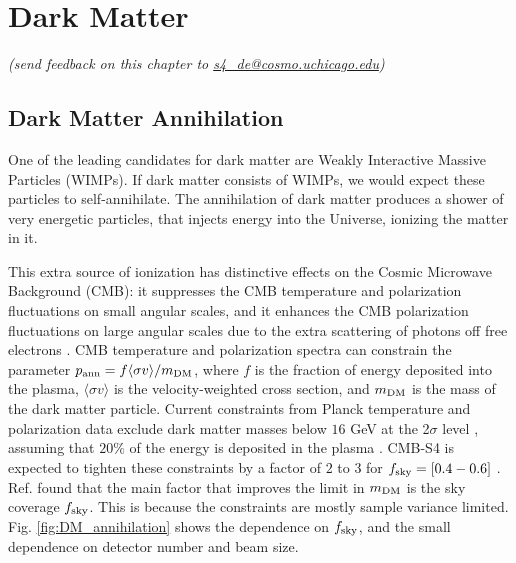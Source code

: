 \chapter{Dark Matter}
\begin{center}
{\small \it (send feedback on this chapter to \href{mailto:s4_de@cosmo.uchicago.edu}{s4\_de@cosmo.uchicago.edu})}
\end{center}

\begin{quotation}


\end{quotation}

\section{Dark Matter Annihilation}

One of the leading candidates for dark matter are Weakly Interactive Massive Particles (WIMPs). If dark matter consists of WIMPs, we would expect these particles to self-annihilate. The annihilation of dark matter produces a shower of very energetic particles, that injects energy into the Universe, ionizing the matter in it.

This extra source of ionization has distinctive effects on the Cosmic Microwave Background (CMB): it suppresses the CMB temperature and polarization fluctuations on small angular scales, and it enhances the CMB polarization fluctuations on large angular scales due to the extra scattering of photons off free electrons \cite{Chen:2003gz,Padmanabhan:2005es}.
CMB temperature and polarization spectra can constrain the parameter
$p_{\rm ann}=f\langle\sigma v\rangle/m_{\rm DM}$, where $f$ is the fraction of energy
deposited into the plasma, $\langle\sigma v\rangle$ is the velocity-weighted
cross section, and $m_{\rm DM}$ is the mass of the dark matter particle.
Current constraints from Planck temperature and polarization data exclude
dark matter masses below $16$ GeV at the 2$\sigma$ level \cite{Ade:2015xua}, assuming that
$20\%$ of the energy is deposited in the plasma \cite{Madhavacheril:2013cna}. CMB-S4 is expected to tighten these constraints by a factor of $2$ to $3$ for $f_{\rm sky}=[0.4-0.6]$ \cite{Wu:2014hta}. 
Ref. \cite{Wu:2014hta} found that the main factor that improves the limit in $m_{\rm DM}$ is the sky coverage $f_{\rm sky}$. This is because the constraints are mostly sample variance limited. Fig. \ref{fig:DM_annihilation} shows the dependence on $f_{\rm sky}$, and the small dependence on detector number and beam size.

